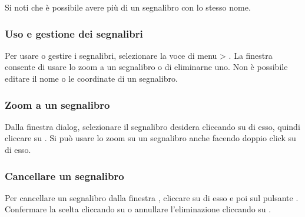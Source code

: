 Si noti che è possibile avere più di un segnalibro con lo stesso nome.

\subsubsection{Uso e gestione dei segnalibri}
Per usare o gestire i segnalibri, selezionare la voce di menu
 > .
La finestra  consente di usare lo zoom a un
segnalibro o di eliminarne uno.
Non è possibile editare il nome o le coordinate di un segnalibro.

\subsubsection{Zoom a un segnalibro}
Dalla finestra  dialog, selezionare il
segnalibro desidera cliccando su di esso, quindi cliccare su .
Si può usare lo zoom su un segnalibro anche facendo doppio click su di esso.

\subsubsection{Cancellare un segnalibro}
Per cancellare un segnalibro dalla finestra ,
cliccare su di esso e poi sul pulsante .
Confermare la scelta cliccando su  o annullare l'eliminazione
cliccando su .
